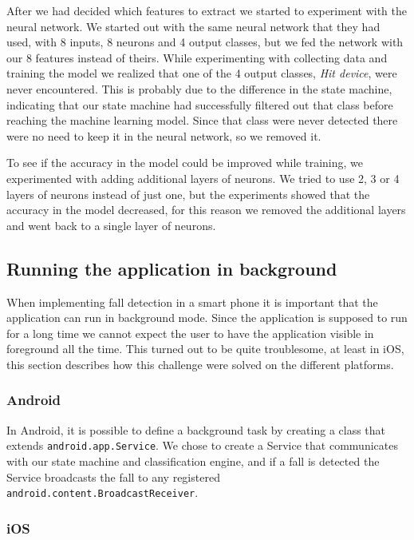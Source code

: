 \documentclass[12pt, a4paper, onecolumn]{article}
\begin{document}
	After we had decided which features to extract we started to experiment with the neural network. We started out with the same neural network that they had used, with 8 inputs, 8 neurons and 4 output classes, but we fed the network with our 8 features instead of theirs. While experimenting with collecting data and training the model we realized that one of the 4 output classes, \textit{Hit device}, were never encountered. This is probably due to the difference in the state machine, indicating that our state machine had successfully filtered out that class before reaching the machine learning model. Since that class were never detected there were no need to keep it in the neural network, so we removed it.
	
	To see if the accuracy in the model could be improved while training, we experimented with adding additional layers of neurons. We tried to use 2, 3 or 4 layers of neurons instead of just one, but the experiments showed that the accuracy in the model decreased, for this reason we removed the additional layers and went back to a single layer of neurons.
	
	
	
	
	
	
	\subsection{Running the application in background}
	
	When implementing fall detection in a smart phone it is important that the application can run in background mode. Since the application is supposed to run for a long time we cannot expect the user to have the application visible in foreground all the time. This turned out to be quite troublesome, at least in iOS, this section describes how this challenge were solved on the different platforms.
	
	\subsubsection{Android}
	
	In Android, it is possible to define a background task by creating a class that extends \texttt{android.app.Service}. We chose to create a Service that communicates with our state machine and classification engine, and if a fall is  detected the Service broadcasts the fall to any registered \\ \texttt{android.content.BroadcastReceiver}.
	
	\subsubsection{iOS}
	
\end{document}

